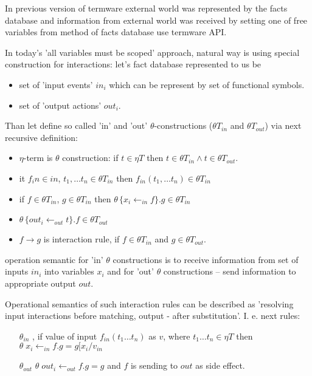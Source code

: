 \documentclass[10pt]{article}
\begin{document}
In previous version of termware external world was represented by the facts database and
information from external world was received by setting one of free variables from method
of facts database use termware API.

 In today's 'all variables must be scoped' approach, natural way is using special 
construction for interactions: let's fact database represented to us be
\begin{itemize}
 \item set of 'input events' $in_i$ which can be represent by set of functional symbols.
 \item set of 'output actions' $out_i$.
\end{itemize} 

Than let define so called 'in' and 'out' $\theta$-constructions
 (${\theta}T_{in}$ and ${\theta}T_{out}$) via next recursive definition:
\begin{itemize}
 \item  $\eta$-term is $\theta$ construction:
 if $t\in {\eta}T$ then $t\in {\theta}T_{in}  \land t\in {\theta}T_{out}$.
 \item it $f_in\in {in}$, $t_1,\dots t_n \in {\theta}T_{in}$ then
                   $f_{in}(t_1,\dots t_n) \in {\theta}T_{in}$  
 \item if $f\in {\theta}T_{in}$, $g\in {\theta}T_{in}$ then 
       $\theta\, \{x_i {\leftarrow_{in}} f\}.g \in {\theta}T_{in}$  
 \item  
 $\theta\, \{out_i \leftarrow_{out} t \}.f \in {\theta}T_{out} $ 
 \item  $f\to g$ is interaction rule, 
   if $f \in {\theta}T_{in}$ and $g \in {\theta}T_{out}$.
\end{itemize}

 operation semantic for 'in' $\theta$ constructions is to receive information from set of inputs ${in}_i$ into variables $x_i$ and for 'out' $\theta$ constructions -- send information
to appropriate output $out$. 

Operational semantics of such interaction rules can be described as 'resolving input interactions before matching, output - after substitution'. I. e. next rules:
\begin{itemize}
 \item[$\theta_{in}$],
  if value of input $f_{in}(t_1\dots t_n)$ as $v$,
    where $t_1 \dots t_n \in \eta T$
    then $\theta\;x_{i}\leftarrow_{in}f . g = g[x_{i}/v_{in}$       
 \item[$\theta_{out}$]
     $\theta\;out_{i}\leftarrow_{out}f . g = g$ and $f$ is sending to $out$ as side effect.
\end{itemize}
  
\end{document}
